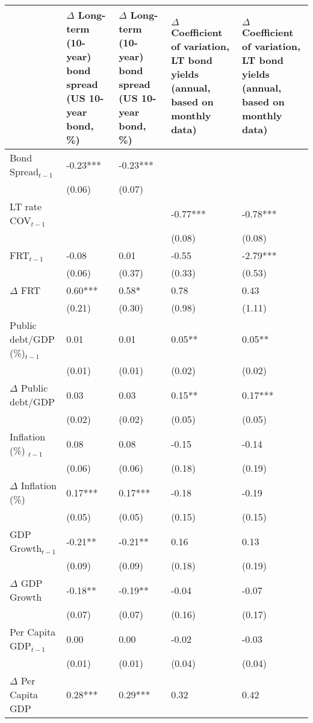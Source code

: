 \begingroup\tiny
\begin{tabular}{lp{3cm}p{3cm}p{3cm}p{3cm}}
  \hline
 & $\Delta$ Long-term (10-year) bond spread (US 10-year bond, \%) & $\Delta$ Long-term (10-year) bond spread (US 10-year bond, \%) & $\Delta$ Coefficient of variation, LT bond yields (annual, based on monthly data) & $\Delta$ Coefficient of variation, LT bond yields (annual, based on monthly data) \\ 
  \hline
Bond Spread$_{t-1}$ & -0.23*** & -0.23*** &  &  \\ 
   & (0.06) & (0.07) &  &  \\ 
  LT rate COV$_{t-1}$ &  &  & -0.77*** & -0.78*** \\ 
   &  &  & (0.08) & (0.08) \\ 
  FRT$_{t-1}$ & -0.08 & 0.01 & -0.55 & -2.79*** \\ 
   & (0.06) & (0.37) & (0.33) & (0.53) \\ 
  $\Delta$ FRT & 0.60*** & 0.58* & 0.78 & 0.43 \\ 
   & (0.21) & (0.30) & (0.98) & (1.11) \\ 
  Public debt/GDP (\%)$_{t-1}$ & 0.01 & 0.01 & 0.05** & 0.05** \\ 
   & (0.01) & (0.01) & (0.02) & (0.02) \\ 
  $\Delta$ Public debt/GDP & 0.03 & 0.03 & 0.15** & 0.17*** \\ 
   & (0.02) & (0.02) & (0.05) & (0.05) \\ 
  Inflation (\%) $_{t-1}$ & 0.08 & 0.08 & -0.15 & -0.14 \\ 
   & (0.06) & (0.06) & (0.18) & (0.19) \\ 
  $\Delta$ Inflation (\%) & 0.17*** & 0.17*** & -0.18 & -0.19 \\ 
   & (0.05) & (0.05) & (0.15) & (0.15) \\ 
  GDP Growth$_{t-1}$ & -0.21** & -0.21** & 0.16 & 0.13 \\ 
   & (0.09) & (0.09) & (0.18) & (0.19) \\ 
  $\Delta$ GDP Growth & -0.18** & -0.19** & -0.04 & -0.07 \\ 
   & (0.07) & (0.07) & (0.16) & (0.17) \\ 
  Per Capita GDP$_{t-1}$ & 0.00 & 0.00 & -0.02 & -0.03 \\ 
   & (0.01) & (0.01) & (0.04) & (0.04) \\ 
  $\Delta$ Per Capita GDP & 0.28*** & 0.29*** & 0.32 & 0.42 \\ 

\end{tabular}

